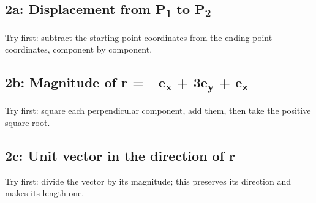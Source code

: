 \documentclass[11pt]{article}
\begin{document}
\begin{keepsection}
\begin{keepsection}
\subsection{2a: Displacement from P\textsubscript{1} to P\textsubscript{2}}

Try first: subtract the starting point coordinates from the ending point coordinates, component by component.

\end{keepsection}

\begin{keepsection}
\subsection{2b: Magnitude of r = \ensuremath{-}e\textsubscript{x} + 3e\textsubscript{y} + e\textsubscript{z}}

Try first: square each perpendicular component, add them, then take the positive square root.

\end{keepsection}

\begin{keepsection}
\subsection{2c: Unit vector in the direction of r}

Try first: divide the vector by its magnitude; this preserves its direction and makes its length one.

\end{keepsection}
\end{keepsection}
\end{document}
